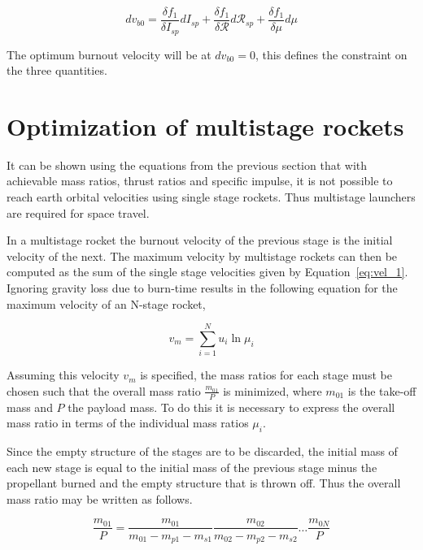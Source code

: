 \begin{equation}
    dv_{b0}=\frac{\delta f_1}{\delta I_{sp}} dI_{sp}
           +\frac{\delta f_1}{\delta \mathscr{R}} d\mathscr{R}_{sp}
           +\frac{\delta f_1}{\delta \mu} d\mu
\end{equation}

The optimum burnout velocity will be at $dv_{b0}=0$, this defines the constraint on the three quantities.


\section{Optimization of multistage rockets}
It can be shown using the equations from the previous section that with achievable mass ratios, thrust ratios and specific impulse, it is not possible to reach earth orbital velocities using single stage rockets. Thus multistage launchers are required for space travel.

In a multistage rocket the burnout velocity of the previous stage is the initial velocity of the next. The maximum velocity by multistage rockets can then be computed as the sum of the single stage velocities given by Equation~\eqref{eq:vel_1}.
Ignoring gravity loss due to burn-time results in the following equation for the maximum velocity of an N-stage rocket,

\begin{equation}
    \label{eq:vel_vm}
    v_m = \sum_{i=1}^N u_i \ln{\mu_i}
\end{equation}


Assuming this velocity $v_m$ is specified, the mass ratios for each stage must be chosen such that the overall mass ratio $\frac{m_{01}}{P}$ is minimized, where $m_{01}$ is the take-off mass and $P$ the payload mass. To do this it is necessary to express the overall mass ratio in terms of the individual mass ratios $\mu_i$.

Since the empty structure of the stages are to be discarded, the initial mass of each new stage is equal to the initial mass of the previous stage minus the propellant burned and the empty structure that is thrown off. Thus the overall mass ratio may be written as follows.

\begin{equation}
    \label{eq:overall_mu_1}
    \frac{m_{01}}{P} = \frac{m_{01}}{m_{01} - m_{p1} - m_{s1}} 
                       \frac{m_{02}}{m_{02} - m_{p2} - m_{s2}} \dots
                       \frac{m_{0N}}{P}
\end{equation}

